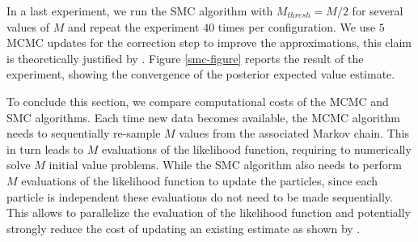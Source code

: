 In a last experiment, we run the SMC algorithm with $M_{thresh} = M/2$ for several values of $M$ and repeat the experiment $40$ times per configuration. We use $5$ MCMC updates for the correction step to improve the approximations, this claim is theoretically justified by \cite{marion2018finite}. Figure \ref{smc-figure} reports the result of the experiment, showing the convergence of the posterior expected value estimate.

To conclude this section, we compare computational costs of the MCMC and SMC algorithms. Each time new data becomes available, the MCMC algorithm needs to sequentially re-sample $M$ values from the associated Markov chain. This in turn leads to $M$ evaluations of the likelihood function, requiring to numerically solve $M$ initial value problems. While the SMC algorithm also needs to perform $M$ evaluations of the likelihood function to update the particles, since each particle is independent these evaluations do not need to be made sequentially. This allows to parallelize the evaluation of the likelihood function and potentially strongly reduce the cost of updating an existing estimate as shown by \cite{lee2010utility}.

